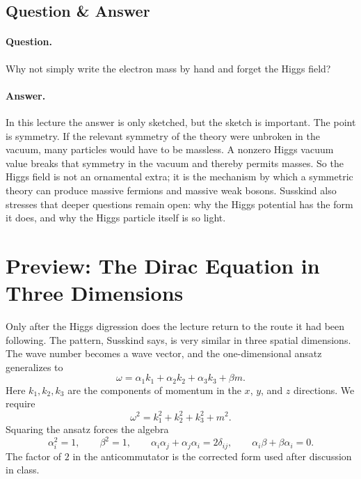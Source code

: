 \subsection{Question \& Answer}

\paragraph{Question.} Why not simply write the electron mass by hand and forget the Higgs field?

\paragraph{Answer.} In this lecture the answer is only sketched, but the sketch is important. The point is symmetry. If the relevant symmetry of the theory were unbroken in the vacuum, many particles would have to be massless. A nonzero Higgs vacuum value breaks that symmetry in the vacuum and thereby permits masses. So the Higgs field is not an ornamental extra; it is the mechanism by which a symmetric theory can produce massive fermions and massive weak bosons. Susskind also stresses that deeper questions remain open: why the Higgs potential has the form it does, and why the Higgs particle itself is so light.

\section{Preview: The Dirac Equation in Three Dimensions}

Only after the Higgs digression does the lecture return to the route it had been following. The pattern, Susskind says, is very similar in three spatial dimensions. The wave number becomes a wave vector, and the one-dimensional ansatz generalizes to
\begin{equation}
\omega=\alpha_1k_1+\alpha_2k_2+\alpha_3k_3+\beta m.
\end{equation}
Here \(k_1,k_2,k_3\) are the components of momentum in the \(x\), \(y\), and \(z\) directions. We require
\begin{equation}
\omega^2=k_1^2+k_2^2+k_3^2+m^2.
\end{equation}
Squaring the ansatz forces the algebra
\begin{equation}
\alpha_i^2=1,
\qquad
\beta^2=1,
\qquad
\alpha_i\alpha_j+\alpha_j\alpha_i=2\delta_{ij},
\qquad
\alpha_i\beta+\beta\alpha_i=0.
\end{equation}
The factor of \(2\) in the anticommutator is the corrected form used after discussion in class.

